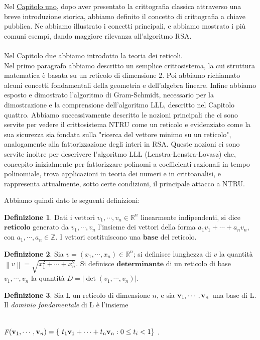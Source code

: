 \documentclass[a4paper,12pt]{report}
\theoremstyle{plain}
\theoremstyle{definition}
\newtheorem{defn}{Definizione}[chapter]
\theoremstyle{remark}
\begin{document}
  Nel \underline{Capitolo uno}, dopo aver presentato la crittografia classica attraverso una breve introduzione storica, abbiamo definito il concetto di crittografia a chiave pubblica. Ne abbiamo illustrato i concetti principali, e abbiamo mostrato i pi\` u comuni esempi, dando maggiore rilevanza all'algoritmo RSA. 
\\ \\ 
  Nel \underline {Capitolo due} abbiamo introdotto la teoria dei reticoli. 
\\Nel primo paragrafo abbiamo descritto un semplice crittosistema, la cui struttura matematica \`e basata su un reticolo di dimensione 2. Poi abbiamo richiamato alcuni concetti fondamentali della geometria e dell'algebra lineare. Infine abbiamo esposto e dimostrato l'algoritmo di Gram-Schmidt, necessario per la dimostrazione e la comprensione dell'algoritmo LLL, descritto nel Capitolo quattro.
Abbiamo successivamente descritto le nozioni principali che ci sono servite per vedere il crittosistema NTRU come un reticolo e evidenziato come la sua sicurezza sia fondata sulla "ricerca del vettore minimo su un reticolo", analogamente alla fattorizzazione degli interi in RSA.
Queste nozioni ci sono servite inoltre per descrivere l'algoritmo LLL (Lenstra-Lenstra-Lovasz) che, concepito inizialmente per fattorizzare polinomi a coefficienti razionali in tempo polinomiale, trova applicazioni in teoria dei numeri e in crittoanalisi, e rappresenta attualmente, sotto certe condizioni, il principale attacco a NTRU. 

Abbiamo quindi dato le seguenti definizioni:\\

\begin{defn}
Dati i vettori $v_1,\cdots,v_n \in \mathbb{R}^n$ linearmente indipendenti, si dice $\mathbf {reticolo}$ generato da $v_1,\cdots,v_n$ l'insieme dei vettori della forma $a_1v_1+\cdots+a_nv_n$, con $a_1,\cdots,a_n \in \mathbb{Z}$. I vettori costituiscono una $\mathbf{base}$ del reticolo.
\end{defn}
\begin {defn}
Sia $v=(x_1,\cdots,x_n)\in \mathbb{R}^n$; si definisce lunghezza di $v$ la quantit\` a $\left\|v \right\|=\sqrt{x_1^2+\cdots+x_n^2}$.
Si definisce $\mathbf{determinante}$ di un reticolo di base $v_1,\cdots,v_n$ la quantit\` a $D=\left|\det(v_1,\cdots,v_n) \right|$.

\end{defn}



\begin{defn}
Sia L un reticolo di dimensione $n$, e sia $\textbf v_1,\cdots,\textbf v_n$ una base di L. Il \textit{dominio fondamentale} di L \` e l'insieme
\\ \\ \centerline{\textit{F}$(\textbf v_1,\cdots,\textbf v_n)=\{\ t_1\textbf v_1+\cdots+t_n\textbf v_n: 0\le t_i<1\}\ $.} 
\end{defn}
\end{document}
